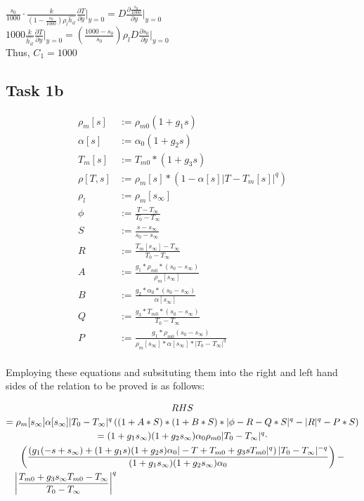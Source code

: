 	\noindent $\frac{s_0}{1000} \cdot \frac{k}{\left(1-\frac{s_0}{1000}\right)\rho_l \hat{h_{il}}} \frac{\partial T}{\partial y}\big|_{y=0} = D  \frac{\partial \frac{s_0}{1000} }{\partial y}\big|_{y=0}$\\
	
	\noindent $1000 \frac{k}{\hat{h_{il}}} \frac{\partial T}{\partial y}\big|_{y=0} = \left(\frac{1000-s_0}{s_0}\right) \rho_l D \frac{\partial s_0}{\partial y}\big|_{y=0} $\\
	
	Thus, $C_1 = 1000 $\\
	
	
	\subsection*{Task 1b} %
	\label{ssec:Task 1b}

	\begin{align*}
		\rho_m[s]&:=\rho_{m0}(1+g_1 s)\\
		\alpha[s]&:=\alpha_0(1+g_2 s)\\
		T_m[s]&:=T_{m0}*(1+g_3 s)\\
		\rho[T,s]&:=\rho_m[s]*\left(1-\alpha[s] |T-T_m[s]|^q\right)\\
		\rho_l&:=\rho_m[s_\infty]\\
		\phi&:=\frac{T-T_\infty}{T_0-T_\infty}\\
		S&:=\frac{s-s_\infty}{s_0-s_\infty}\\
		R&:=\frac{T_m[s_\infty]-T_\infty}{T_0-T_\infty}\\
		A&:=\frac{g_1*\rho_{m0}*(s_0-s_\infty)}{\rho_m[s_\infty]}\\
		B&:=\frac{g_2*\alpha_0*(s_0-s_\infty)}{\alpha[s_\infty]}\\
		Q&:=\frac{g_3*T_{m0}*(s_0-s_\infty)}{T_0-T_\infty}\\
		P&:=\frac{g_1*\rho_{m0}(s_0-s_\infty)}{\rho_m[s_\infty]*\alpha[s_\infty]*|T_0-T_\infty|^q}\\
	\end{align*}

	Employing these equations and subsituting them into the right and left hand sides of the relation to be proved is as follows:

	\begin{multline*}
		RHS\\
		= \rho_m[s_\infty] \alpha[s_\infty] |T_0-T_\infty|^q \left((1+A*S)*(1+B*S)*|\phi 	-R-Q*S|^q-|R|^q-P*S\right) \\
		= (1+g_1 s_\infty) (1+g_2 s_\infty) \alpha_0 \rho_{m0} |T_0-T_\infty|^q \cdot \\
		\left(\frac{\left(g_1 (-s+s_\infty)+(1+g_1 s) (1+g_2 s) \alpha_0 |-T+T_{m0}+g_3 s T_{m0}|^q\right)
		|T_0-T_\infty|^{-q}}{(1+g_1 s_\infty) (1+g_2 s_\infty) \alpha_0}\right) -\\ 
		\shoveleft{\left|\frac{T_{m0}+g_3 s_\infty T_{m0}-T_\infty}{T_0-T_\infty}\right|^q}
	\end{multline*}

